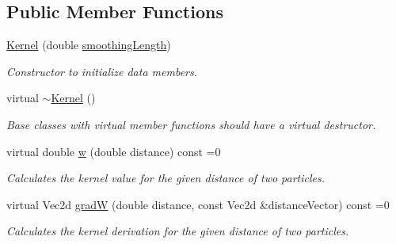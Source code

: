 \subsection*{Public Member Functions}
\begin{CompactItemize}
\item 
\hypertarget{classKernel_7ff93426a5df552fdb40f0600dbfe314}{
\hyperlink{classKernel_7ff93426a5df552fdb40f0600dbfe314}{Kernel} (double \hyperlink{classKernel_f088821dba4a00d1d320b27ebcb71258}{smoothingLength})}
\label{classKernel_7ff93426a5df552fdb40f0600dbfe314}

\begin{CompactList}\small\item\em Constructor to initialize data members. \item\end{CompactList}\item 
virtual \hyperlink{classKernel_9c7407e3a0b1cb9b2f96e9a030187064}{$\sim$Kernel} ()
\begin{CompactList}\small\item\em Base classes with virtual member functions should have a virtual destructor. \item\end{CompactList}\item 
\hypertarget{classKernel_6b4d26ba99457a4acbbbca1454dbdc8a}{
virtual double \hyperlink{classKernel_6b4d26ba99457a4acbbbca1454dbdc8a}{w} (double distance) const =0}
\label{classKernel_6b4d26ba99457a4acbbbca1454dbdc8a}

\begin{CompactList}\small\item\em Calculates the kernel value for the given distance of two particles. \item\end{CompactList}\item 
\hypertarget{classKernel_545e61b98db05db6dd02b88e2ad3da23}{
virtual Vec2d \hyperlink{classKernel_545e61b98db05db6dd02b88e2ad3da23}{gradW} (double distance, const Vec2d \&distanceVector) const =0}
\label{classKernel_545e61b98db05db6dd02b88e2ad3da23}

\begin{CompactList}\small\item\em Calculates the kernel derivation for the given distance of two particles. \item\end{CompactList}\end{CompactItemize}
